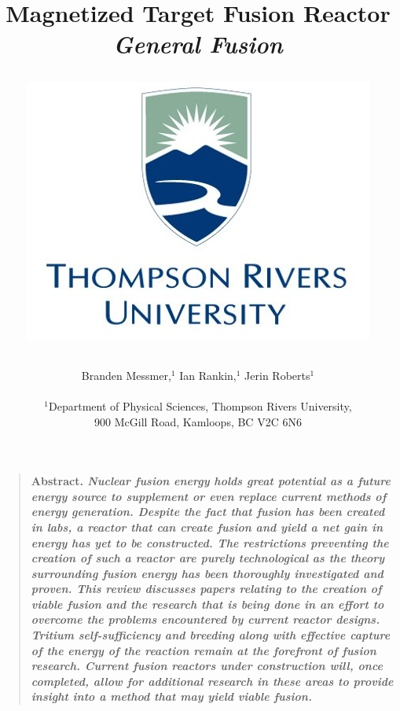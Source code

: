 \documentclass[12pt]{article}
\title{Magnetized Target Fusion Reactor {\it General Fusion\/}
\newline
\newline
\centerline{\includegraphics[width=0.10\linewidth]{tru}}}
\author
{Branden Messmer,$^{1}$ Ian Rankin,$^{1}$ Jerin Roberts$^{1}$\\
\\
\normalsize{$^{1}$Department of Physical Sciences, Thompson Rivers University,}\\
\normalsize{900 McGill Road, Kamloops, BC V2C 6N6}\\
}
\date{}
\newenvironment{sciabstract}{%
\begin{quote} \bf}
{\end{quote}}
\begin{document}
 


\baselineskip24pt


\maketitle 

\begin{singlespace}
\begin{sciabstract}
  Abstract. {\it Nuclear fusion energy holds great potential as a future energy source to supplement or even replace current methods of energy generation.  Despite the fact that fusion has been created in labs, a reactor that can create fusion and yield a net gain in energy has yet to be constructed. The restrictions preventing the creation of such a reactor are purely technological as the theory surrounding fusion energy has been thoroughly investigated and proven.  This review discusses papers relating to the creation of viable fusion and the research that is being done in an effort to overcome the problems encountered by current reactor designs.  Tritium self-sufficiency and breeding along with effective capture of the energy of the reaction remain at the forefront of fusion research.  Current fusion reactors under construction will, once completed, allow for additional research in these areas to provide insight into a method that may yield viable fusion.
  \/} 
  
\end{sciabstract}








\end{singlespace}
\end{document}
